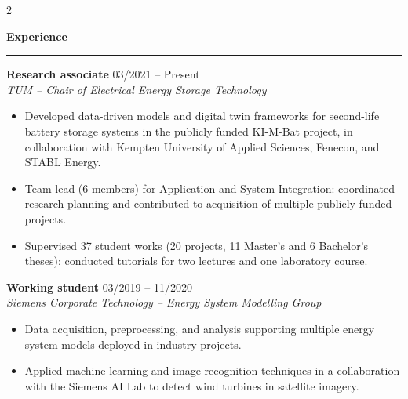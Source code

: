 \documentclass[11pt,a4paper]{article}
\newcommand{\rightsection}[1]{
    \vspace{0.8em}
    {\large\bfseries #1}\\
    \vspace{0.2em}
    \noindent\hspace*{-0.4cm}\rule{\dimexpr\linewidth+0.4cm\relax}{0.4pt}
    \vspace{0.4em}
}
\newcommand{\entry}[4]{
    \textbf{#1} \hfill {#2}\\
    \textit{#3} \hfill \textit{#4}\\
}
\newlength{\mainpad}
\begin{document}
\begin{paracol}{2}
    \switchcolumn
    \color{black}
    \begin{adjustwidth}{\mainpad}{\mainpad}

        \vspace{-0.1cm}
        \rightsection{Experience}
        \entry{Research associate}{03/2021 -- Present}{TUM -- Chair of Electrical Energy Storage Technology}{}
        \vspace{-0.3cm}
        \begin{itemize}
            \item Developed data-driven models and digital twin frameworks for second-life battery storage systems in the publicly funded KI-M-Bat project, in collaboration with Kempten University of Applied Sciences, Fenecon, and STABL Energy.
            \item Team lead (6 members) for Application and System Integration: coordinated research planning and contributed to acquisition of multiple publicly funded projects.
            \item Supervised 37 student works (20 projects, 11 Master's and 6 Bachelor's theses); conducted tutorials for two lectures and one laboratory course.
        \end{itemize}
        \vspace{0.5cm}

        \entry{Working student}{03/2019 -- 11/2020}
        {Siemens Corporate Technology -- Energy System Modelling Group}{}
        \vspace{-0.3cm}
        \begin{itemize}
            \item Data acquisition, preprocessing, and analysis supporting multiple energy system models deployed in industry projects.
            \item Applied machine learning and image recognition techniques in a collaboration with the Siemens AI Lab to detect wind turbines in satellite imagery.
        \end{itemize}
        \vspace{0.5cm}



\end{adjustwidth}
\end{paracol}
\end{document}
